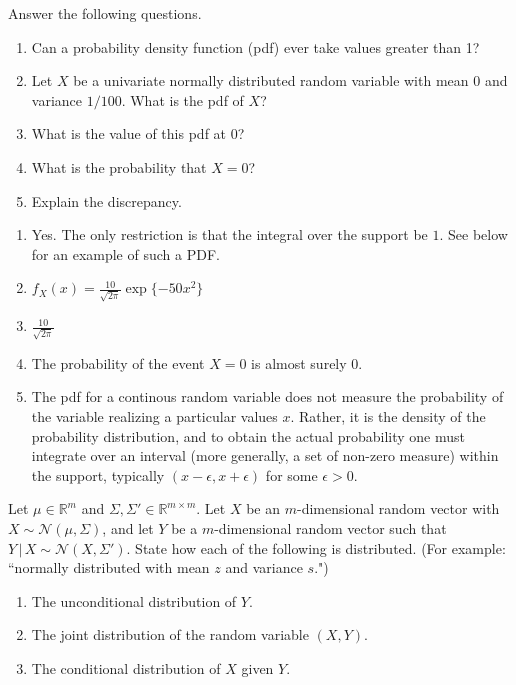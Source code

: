 \documentclass[submit]{harvardml}
\newcommand{\given}{\,|\,}
\newcommand{\R}{\mathbb{R}}
\begin{document}

\begin{problem}[Densities]
Answer the following questions.
\begin{enumerate}[label=(\alph*)]
  \item Can a probability density function (pdf) ever take values greater than 1?
  \item Let $X$ be a univariate normally distributed random variable with mean 0 and variance $1/100$. What is the pdf of $X$?
  \item What is the value of this pdf at 0?
  \item What is the probability that $X = 0$?
  \item Explain the discrepancy.
\end{enumerate}
\end{problem}

\begin{enumerate}[label=(\alph*)]
\item Yes. The only restriction is that the integral over the support be $1$. See below for an example of such a PDF.
\item $f_X(x) = \frac{10}{\sqrt{2\pi}}\exp\{-50x^2\}$
\item $\frac{10}{\sqrt{2\pi}}$
\item The probability of the event $X = 0$ is almost surely $0$.
\item The pdf for a continous random variable does not measure the probability of the variable realizing a particular values $x$. Rather, it is the density of the probability distribution, and to obtain the actual probability one must integrate over an interval (more generally, a set of non-zero measure) within the support, typically $(x - \epsilon, x + \epsilon)$ for some $\epsilon > 0$.
\end{enumerate}


\begin{problem}
Let $\mu \in \R^m$ and $\Sigma, \Sigma' \in \R^{m \times m}$. Let $X$ be an $m$-dimensional random vector with $X \sim \mathcal{N}(\mu, \Sigma)$, and let $Y$ be a $m$-dimensional random vector such that $Y \given X \sim \mathcal{N}(X, \Sigma')$. State how each of the following is distributed. (For example: ``normally distributed with mean $z$ and variance $s$.")
\begin{enumerate}[label=(\alph*)]
  \item The unconditional distribution of $Y$.
  \item The joint distribution of the random variable $(X,Y)$.
  \item The conditional distribution of $X$ given $Y$.
\end{enumerate}
\end{problem}
\end{document}
